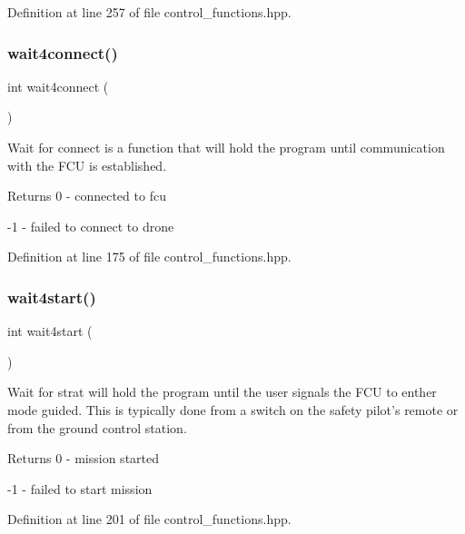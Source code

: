 Definition at line 257 of file control\+\_\+functions.\+hpp.

\mbox{\label{group__control__functions_ga1921a30d419eb397f7e40875217b45d1}} 
\subsubsection{\texorpdfstring{wait4connect()}{wait4connect()}}
{\footnotesize\ttfamily int wait4connect (\begin{DoxyParamCaption}{ }\end{DoxyParamCaption})}

Wait for connect is a function that will hold the program until communication with the F\+CU is established. \begin{DoxyReturn}{Returns}
0 -\/ connected to fcu 

-\/1 -\/ failed to connect to drone 
\end{DoxyReturn}


Definition at line 175 of file control\+\_\+functions.\+hpp.

\mbox{\label{group__control__functions_gab6fe46f505ab9804b4ed98b96286a811}} 
\subsubsection{\texorpdfstring{wait4start()}{wait4start()}}
{\footnotesize\ttfamily int wait4start (\begin{DoxyParamCaption}{ }\end{DoxyParamCaption})}

Wait for strat will hold the program until the user signals the F\+CU to enther mode guided. This is typically done from a switch on the safety pilot’s remote or from the ground control station. \begin{DoxyReturn}{Returns}
0 -\/ mission started 

-\/1 -\/ failed to start mission 
\end{DoxyReturn}


Definition at line 201 of file control\+\_\+functions.\+hpp.

